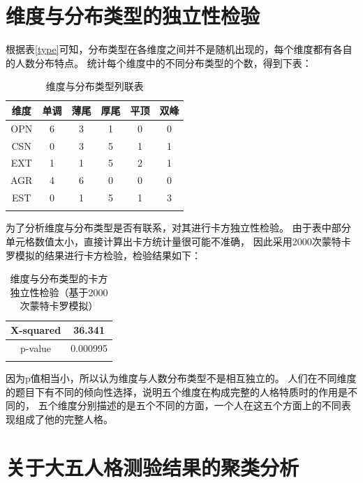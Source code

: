 \documentclass[UTF8]{ctexart}
\begin{document}
\part{维度与分布类型的独立性检验}
根据表\ref{type}可知，分布类型在各维度之间并不是随机出现的，每个维度都有各自的人数分布特点。
统计每个维度中的不同分布类型的个数，得到下表：
\begin{longtable}{c|c|c|c|c|c}
  \hline
  维度  & 单调 & 薄尾 & 厚尾 & 平顶 & 双峰 \\\hline
  OPN & 6  & 3  & 1  & 0  & 0  \\
  CSN & 0  & 3  & 5  & 1  & 1  \\
  EXT & 1  & 1  & 5  & 2  & 1  \\
  AGR & 4  & 6  & 0  & 0  & 0  \\
  EST & 0  & 1  & 5  & 1  & 3  \\\hline
  \caption{维度与分布类型列联表}
\end{longtable}
为了分析维度与分布类型是否有联系，对其进行卡方独立性检验。
由于表中部分单元格数值太小，直接计算出卡方统计量很可能不准确，
因此采用2000次蒙特卡罗模拟的结果进行卡方检验，检验结果如下：
\begin{longtable}{c|c}
  \hline
  X-squared & 36.341   \\\hline
  p-value   & 0.000995 \\\hline
  \caption{维度与分布类型的卡方独立性检验（基于2000次蒙特卡罗模拟）}
\end{longtable}
因为p值相当小，所以认为维度与人数分布类型不是相互独立的。
人们在不同维度的题目下有不同的倾向性选择，说明五个维度在构成完整的人格特质时的作用是不同的，
五个维度分别描述的是五个不同的方面，一个人在这五个方面上的不同表现组成了他的完整人格。
\part{关于大五人格测验结果的聚类分析}
\setcounter{section}{0}
\end{document}
